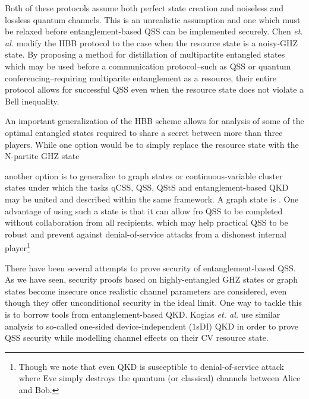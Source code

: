 Both of these protocols \cite{Hillery1999, Karlsson1999} assume both perfect state creation and noiseless and lossless quantum channels. This is an unrealistic assumption and one which must be relaxed before entanglement-based QSS can be implemented securely. Chen \emph{et. al.} \cite{Chen2005a} modify the HBB protocol to the case when the resource state is a noisy-GHZ state. By proposing a method for distillation of multipartite entangled states which may be used before a communication protocol--such as QSS or quantum conferencing--requiring multiparite entanglement as a resource, their entire protocol allows for successful QSS even when the resource state does not violate a Bell inequality.


An important generalization of the HBB scheme allows for analysis of some of the optimal entangled states required to share a secret between more than three players. While one option would be to simply replace the resource state with the N-partite GHZ state


\noindent another option is to generalize to graph states \cite{Markham2008a, Keet2010} or continuous-variable cluster states \cite{Lau2013, Wu2016} under which the tasks qCSS, QSS, QStS and entanglement-based QKD may be united and described within the same framework. A graph state is . One advantage of using such a state is that it can allow fro QSS to be completed without collaboration from all recipients, which may help practical QSS to be robust and prevent against denial-of-service attacks from a dishonest internal player\footnote{Though we note that even QKD is susceptible to denial-of-service attack where Eve simply destroys the quantum (or classical) channels between Alice and Bob.}

There have been several attempts to prove security of entanglement-based QSS. As we have seen, security proofs based on highly-entangled GHZ states or graph states become insecure once realistic channel parameters are considered, even though they offer unconditional security in the ideal limit. One way to tackle this is to borrow tools from entanglement-based QKD. Kogias \emph{et. al.} use similar analysis to so-called one-sided device-independent ($1$sDI) QKD \cite{Armstrong2015}  in order to prove QSS security while modelling channel effects on their CV resource state.

